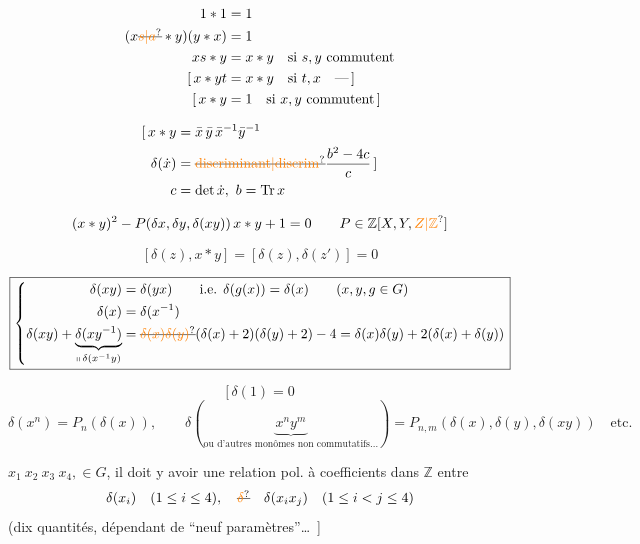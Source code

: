 
\[
\begin{aligned}
1*1&=1\\
(x\deleted{\unsure{s|a}}*y)(y*x)&=1\\
xs*y&=x*y\quad\text{si } s,y\text{ commutent}\\
[\,x*yt&=x*y\quad\text{si }t,x\quad\text{---}\,]\\
[\,x*y&=1\quad\text{si } x,y\text{ commutent}\,]
\end{aligned}
\]

\[
\begin{aligned}
[\,x*y&=\bar{x}\,\bar{y}\,\bar{x}^{-1}\bar{y}^{-1}\\
\delta(\dot x)&=\deleted{\unsure{\mathrm{discriminant}|\mathrm{discrim}}}\frac{b^2-4c}{c}\,]\\
c&=\det\dot x,\ b=\operatorname{Tr}x
\end{aligned}
\]

\[
(x*y)^2-P(\delta x,\delta y,\delta(xy))\,x*y+1=0\qquad P\in\mathbb Z[X,Y,\unsure{Z|\mathbb Z}]
\]

\[
[\delta(z),x*y]=[\delta(z),\delta(z')]=0
\]

\[
\boxed{\left\{\begin{aligned}
\delta(xy)&=\delta(yx)\qquad\text{i.e. }\delta(g(x))=\delta(x)\qquad(x,y,g\in G)\\
\delta(x)&=\delta(x^{-1})\\
\delta(xy)+\underbrace{\delta(xy^{-1})}_{\shortparallel\,\delta(x^{-1}y)}
 &=\deleted{\unsure{\delta(x)\delta(y)}}(\delta(x)+2)(\delta(y)+2)-4
 =\delta(x)\delta(y)+2(\delta(x)+\delta(y))
\end{aligned}\right.}
\]

\[
[\,\boxed{\delta(1)=0}
\]
\[
\delta(x^n)=P_n(\delta(x)),\qquad\delta(\underbrace{x^ny^m}_{\text{ou d'autres monômes non commutatifs\ldots}})=P_{n,m}(\delta(x),\delta(y),\delta(xy))\quad\text{etc.}
\]

$x_1\ x_2\ x_3\ x_4,\in G$, il doit y avoir une relation pol. à coefficients dans $\mathbb Z$ entre
\[
\delta(x_i)\quad(1\leq i\leq4),\quad\deleted{\unsure{\delta}}\quad\delta(x_ix_j)\quad(1\leq i<j\leq4)
\]
(dix quantités,  dépendant de ``neuf paramètres''\ldots\ ]

